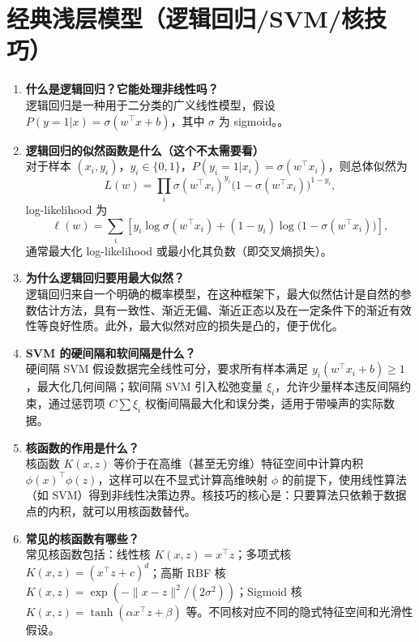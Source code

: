\documentclass{article}
\begin{document}
\section{经典浅层模型（逻辑回归/SVM/核技巧）}
\begin{enumerate}
\item \textbf{什么是逻辑回归？它能处理非线性吗？}\\
逻辑回归是一种用于二分类的广义线性模型，假设 $P(y=1|x)=\sigma(w^\top x+b)$，其中 $\sigma$ 为 sigmoid。。

\item \textbf{逻辑回归的似然函数是什么（这个不太需要看）}\\
对于样本 $(x_i,y_i)$，$y_i\in\{0,1\}$，$P(y_i=1|x_i)=\sigma(w^\top x_i)$，则总体似然为
\[
L(w)=\prod_i \sigma(w^\top x_i)^{y_i} \bigl(1-\sigma(w^\top x_i)\bigr)^{1-y_i},
\]
log-likelihood 为
\[
\ell(w)=\sum_i \left[y_i \log \sigma(w^\top x_i) + (1-y_i)\log\bigl(1-\sigma(w^\top x_i)\bigr)\right],
\]
通常最大化 log-likelihood 或最小化其负数（即交叉熵损失）。

\item \textbf{为什么逻辑回归要用最大似然？}\\
逻辑回归来自一个明确的概率模型，在这种框架下，最大似然估计是自然的参数估计方法，具有一致性、渐近无偏、渐近正态以及在一定条件下的渐近有效性等良好性质。此外，最大似然对应的损失是凸的，便于优化。

\item \textbf{SVM 的硬间隔和软间隔是什么？}\\
硬间隔 SVM 假设数据完全线性可分，要求所有样本满足 $y_i(w^\top x_i + b)\ge 1$，最大化几何间隔；软间隔 SVM 引入松弛变量 $\xi_i$，允许少量样本违反间隔约束，通过惩罚项 $C\sum \xi_i$ 权衡间隔最大化和误分类，适用于带噪声的实际数据。

\item \textbf{核函数的作用是什么？}\\
核函数 $K(x,z)$ 等价于在高维（甚至无穷维）特征空间中计算内积 $\phi(x)^\top\phi(z)$，这样可以在不显式计算高维映射 $\phi$ 的前提下，使用线性算法（如 SVM）得到非线性决策边界。核技巧的核心是：只要算法只依赖于数据点的内积，就可以用核函数替代。

\item \textbf{常见的核函数有哪些？}\\
常见核函数包括：线性核 $K(x,z)=x^\top z$；多项式核 $K(x,z)=(x^\top z + c)^d$；高斯 RBF 核 $K(x,z)=\exp(-\|x-z\|^2/(2\sigma^2))$；Sigmoid 核 $K(x,z)=\tanh(\alpha x^\top z+\beta)$ 等。不同核对应不同的隐式特征空间和光滑性假设。
\end{enumerate}
\end{document}
